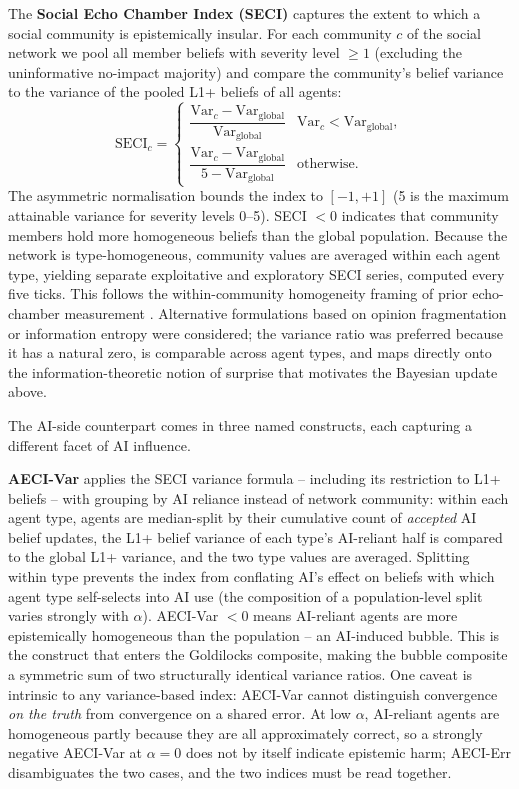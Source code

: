 \documentclass[pdflatex,sn-nature]{sn-jnl}
\begin{document}
The \textbf{Social Echo Chamber Index (SECI)} captures the extent to which a social community is epistemically insular. For each community $c$ of the social network we pool all member beliefs with severity level $\geq 1$ (excluding the uninformative no-impact majority) and compare the community's belief variance to the variance of the pooled L1+ beliefs of all agents:
\begin{equation}
\text{SECI}_c =
\begin{cases}
\dfrac{\text{Var}_c - \text{Var}_{\text{global}}}{\text{Var}_{\text{global}}} & \text{Var}_c < \text{Var}_{\text{global}}, \\[2ex]
\dfrac{\text{Var}_c - \text{Var}_{\text{global}}}{5 - \text{Var}_{\text{global}}} & \text{otherwise}.
\end{cases}
\label{eq:seci}
\end{equation}
The asymmetric normalisation bounds the index to $[-1, +1]$ (5 is the maximum attainable variance for severity levels 0--5). SECI $< 0$ indicates that community members hold more homogeneous beliefs than the global population. Because the network is type-homogeneous, community values are averaged within each agent type, yielding separate exploitative and exploratory SECI series, computed every five ticks. This follows the within-community homogeneity framing of prior echo-chamber measurement \citep{cinelli2021echo}.
Alternative formulations based on opinion fragmentation \citep{bail2018exposure} or information entropy \citep{sasahara2021social}
were considered; the variance ratio was preferred because it has a natural zero, is comparable across agent types, and maps directly onto the information-theoretic notion of surprise that motivates the Bayesian update above.

The AI-side counterpart comes in three named constructs, each capturing a different facet of AI influence.

\textbf{AECI-Var} applies the SECI variance formula -- including its restriction to L1+ beliefs -- with grouping by AI reliance instead of network community: within each agent type, agents are median-split by their cumulative count of \emph{accepted} AI belief updates, the L1+ belief variance of each type's AI-reliant half is compared to the global L1+ variance, and the two type values are averaged. Splitting within type prevents the index from conflating AI's effect on beliefs with which agent type self-selects into AI use (the composition of a population-level split varies strongly with $\alpha$). AECI-Var $< 0$ means AI-reliant agents are more epistemically homogeneous than the population -- an AI-induced bubble. This is the construct that enters the Goldilocks composite, making the bubble composite a symmetric sum of two structurally identical variance ratios. One caveat is intrinsic to any variance-based index: AECI-Var cannot distinguish convergence \emph{on the truth} from convergence on a shared error. At low $\alpha$, AI-reliant agents are homogeneous partly because they are all approximately correct, so a strongly negative AECI-Var at $\alpha = 0$ does not by itself indicate epistemic harm; AECI-Err disambiguates the two cases, and the two indices must be read together.
\end{document}
